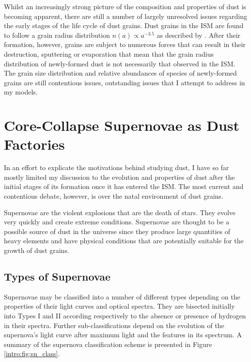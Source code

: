 Whilst an increasingly strong picture of the composition and properties of dust is becoming apparent, there are still a number of largely unresolved issues regarding the early stages of the life cycle of dust grains.  Dust grains in the ISM are found to follow a grain radius distribution $n(a) \propto a^{-3.5}$ as described by \citet{MRN}.  After their formation, however, grains are subject to numerous forces that can result in their destruction, sputtering or evaporation that mean that the grain radius distribution of newly-formed dust is not necessarily that observed in the ISM.  The grain size distribution and relative abundances of species of newly-formed grains are still contentious issues, outstanding issues that I attempt to address in my models.

\section{Core-Collapse Supernovae as Dust Factories}

In an effort to explicate the motivations behind studying dust, I have so far mostly limited my discussion to the evolution and properties of dust after the initial stages of its formation once it has entered the ISM.  The most current and contentious debate, however, is over the natal environment of dust grains.  

Supernovae are the violent explosions that are the death of stars.  They evolve very quickly and create extreme conditions.  Supernovae are thought to be a possible source of dust in the universe since they produce large quantities of heavy elements and have physical conditions that are potentially suitable for the growth of dust grains.  

\subsection{Types of Supernovae}

Supernovae may be classified into a number of different types depending on the properties of their light curves and optical spectra.  They are bisected initially into Types I and II according respectively to the absence or presence of hydrogen in their spectra.  Further sub-classifications depend on the evolution of the supernova's light curve after maximum light and the features in its spectrum.  A summary of the supernova classification scheme is presented in Figure \ref{intro:fig:sn_class}.  

